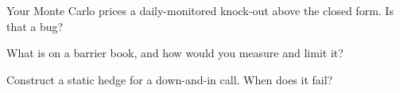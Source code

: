 \begin{interviewq}\label{iq:dv:barriers-and-digitals:4}
Your Monte Carlo prices a daily-monitored knock-out above the closed form. Is that a bug?
\end{interviewq}

\begin{interviewq}\label{iq:dv:barriers-and-digitals:5}
What is  on a barrier book, and how would you measure and limit it?
\end{interviewq}

\begin{interviewq}\label{iq:dv:barriers-and-digitals:6}
Construct a static hedge for a down-and-in call. When does it fail?
\end{interviewq}
